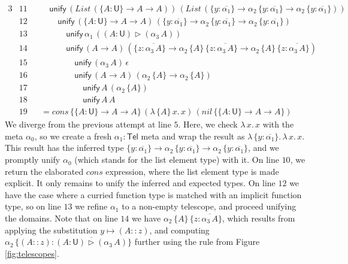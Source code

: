 \documentclass[acmsmall,review,anonymous,prologue,dvipsnames]{acmart}\settopmatter{printfolios=true,printccs=false,printacmref=false}
\renewcommand{\U}{\mathsf{U}}
\newcommand{\unify}{\mathsf{unify}}
\newcommand{\mi}[1]{\mathit{#1}}
\newcommand{\Tel}{\mathsf{Tel}}
\newcommand{\TCons}{\triangleright}
\newcommand{\ol}[1]{\overline{#1}}
\theoremstyle{remark}
\begin{document}
\begin{example}
\begin{alignat*}{3}
  & \scriptstyle{11} && \quad \unify\,(\mi{List}\,(\{A : \U\}\to A \to A))\,(\mi{List}\,(\{y : \ol{\alpha_1}\} \to \alpha_2\,\{y : \ol{\alpha_1}\}\to \alpha_2\,\{y : \ol{\alpha_1}\}))\\
  & \scriptstyle{12} && \qquad \unify\,(\{A : \U\}\to A \to A)\,(\{y : \ol{\alpha_1}\} \to \alpha_2\,\{y : \ol{\alpha_1}\}\to \alpha_2\,\{y : \ol{\alpha_1}\})\\
  & \scriptstyle{13} && \qquad\quad \unify\,\alpha_1\,((A : \U) \TCons (\alpha_3\,A))\\
  & \scriptstyle{14} && \qquad \quad \unify\,(A \to A)\,(\{z : \ol{\alpha_3\,A}\} \to \alpha_2\,\{A\}\,\{z : \ol{\alpha_3\,A}\}\to \alpha_2\,\{A\}\,\{z : \ol{\alpha_3\,A}\})\\
  & \scriptstyle{15} && \qquad \qquad \unify\,(\alpha_3\,A)\,\epsilon\\
  & \scriptstyle{16} && \qquad \qquad \unify\,(A \to A)\,(\alpha_2\,\{A\} \to \alpha_2\,\{A\})\\
  & \scriptstyle{17} && \qquad \qquad \quad \unify\,A\,(\alpha_2\,\{A\})\\
  & \scriptstyle{18} && \qquad \qquad \quad \unify\,A\, A\\
  & \scriptstyle{19} && = \mi{cons}\,\{\{A : \U\}\to A \to A\}\,(\lambda\,\{A\}\,x.\,x)\,(\mi{nil}\,\{\{A : \U\}\to A \to A\})
\end{alignat*}
We diverge from the previous attempt at line $\scriptstyle{5}$. Here, we check
$\lambda\,x.\,x$ with the meta $\alpha_0$, so we create a fresh $\alpha_1 :
\Tel$ meta and wrap the result as $\lambda\,\{y :
\ol{\alpha_1}\}.\,\lambda\,x.\,x$. This result has the inferred type $\{y :
\ol{\alpha_1}\} \to \alpha_2\,\{y : \ol{\alpha_1}\}\to \alpha_2\,\{y :
\ol{\alpha_1}\}$, and we promptly unify $\alpha_0$ (which stands for the list
element type) with it. On line $\scriptstyle{10}$, we return the elaborated
$\mi{cons}$ expression, where the list element type is made explicit. It only remains
to unify the inferred and expected types. On line $\scriptstyle{12}$ we have the
case where a curried function type is matched with an implicit function type, so
on line $\scriptstyle{13}$ we refine $\alpha_1$ to a non-empty telescope, and
proceed unifying the domains. Note that on line $\scriptstyle{14}$ we have
$\alpha_2\,\{A\}\,\{z : \ol{\alpha_3\,A}\}$, which results from applying the
substitution $y \mapsto (A :: z)$, and computing $\alpha_2\,\{(A :: z) : \ol{(A :
  \U) \TCons (\alpha_3\,A)}\}$ further using the \LabTirName{app-$\TCons$} rule
from Figure \ref{fig:telescopes}.


\end{example}
\end{document}
